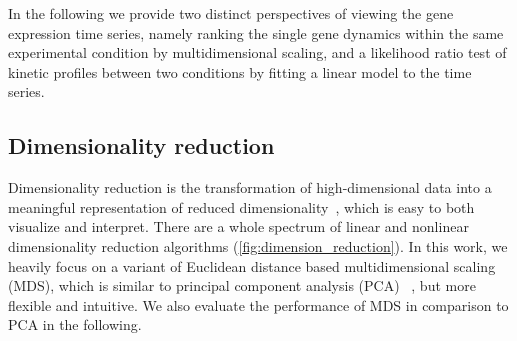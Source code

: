 In the following we provide two distinct 
perspectives of viewing the gene expression time series, namely ranking the 
single gene dynamics within the same experimental condition by multidimensional
scaling, and a likelihood ratio test of kinetic profiles between two conditions
by fitting a linear model to the time series.

\subsection{Dimensionality reduction}
Dimensionality reduction is the transformation of high-dimensional data into 
a meaningful representation of reduced dimensionality~\citep{Maaten2009}, 
which is easy to both visualize and interpret. There are a whole spectrum of linear
and nonlinear dimensionality reduction algorithms 
(\ref{fig:dimension_reduction}). In this work, we heavily 
focus on a variant of Euclidean distance based multidimensional 
scaling (MDS), which is similar to principal component analysis (PCA)%
~\citep{Haerdle2003},
but more flexible and intuitive. We also evaluate the performance of MDS in comparison to 
PCA in the following.

